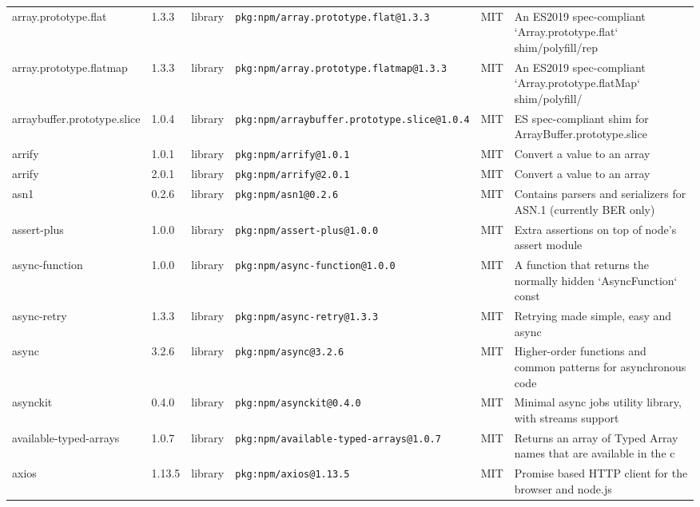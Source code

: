 \documentclass[11pt,a4paper]{article}
\begin{document}
\begin{longtable}{|p{4cm}|p{2cm}|p{1.6cm}|p{5cm}|p{1.5cm}|p{3.5cm}|}
\raggedright array.prototype.flat & 1.3.3 & library & \small\texttt{pkg:npm/array.prototype.flat@1.3.3} & MIT & \small An ES2019 spec-compliant `Array.prototype.flat` shim/polyfill/rep \\
\raggedright array.prototype.flatmap & 1.3.3 & library & \small\texttt{pkg:npm/array.prototype.flatmap@1.3.3} & MIT & \small An ES2019 spec-compliant `Array.prototype.flatMap` shim/polyfill/ \\
\raggedright arraybuffer.prototype.slice & 1.0.4 & library & \small\texttt{pkg:npm/arraybuffer.prototype.slice@1.0.4} & MIT & \small ES spec-compliant shim for ArrayBuffer.prototype.slice \\
\raggedright arrify & 1.0.1 & library & \small\texttt{pkg:npm/arrify@1.0.1} & MIT & \small Convert a value to an array \\
\raggedright arrify & 2.0.1 & library & \small\texttt{pkg:npm/arrify@2.0.1} & MIT & \small Convert a value to an array \\
\raggedright asn1 & 0.2.6 & library & \small\texttt{pkg:npm/asn1@0.2.6} & MIT & \small Contains parsers and serializers for ASN.1 (currently BER only) \\
\raggedright assert-plus & 1.0.0 & library & \small\texttt{pkg:npm/assert-plus@1.0.0} & MIT & \small Extra assertions on top of node's assert module \\
\raggedright async-function & 1.0.0 & library & \small\texttt{pkg:npm/async-function@1.0.0} & MIT & \small A function that returns the normally hidden `AsyncFunction` const \\
\raggedright async-retry & 1.3.3 & library & \small\texttt{pkg:npm/async-retry@1.3.3} & MIT & \small Retrying made simple, easy and async \\
\raggedright async & 3.2.6 & library & \small\texttt{pkg:npm/async@3.2.6} & MIT & \small Higher-order functions and common patterns for asynchronous code \\
\raggedright asynckit & 0.4.0 & library & \small\texttt{pkg:npm/asynckit@0.4.0} & MIT & \small Minimal async jobs utility library, with streams support \\
\raggedright available-typed-arrays & 1.0.7 & library & \small\texttt{pkg:npm/available-typed-arrays@1.0.7} & MIT & \small Returns an array of Typed Array names that are available in the c \\
\raggedright axios & 1.13.5 & library & \small\texttt{pkg:npm/axios@1.13.5} & MIT & \small Promise based HTTP client for the browser and node.js \\

\end{longtable}
\end{document}
